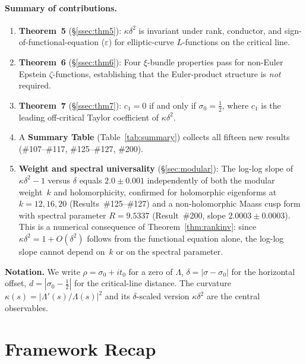 \documentclass[11pt, a4paper]{article}
\theoremstyle{plain}
\theoremstyle{definition}
\begin{document}
\paragraph{Summary of contributions.}
\begin{enumerate}
  \item \textbf{Theorem~5} (\S\ref{ssec:thm5}): $\kappa\delta^{2}$ is
        invariant under rank, conductor, and sign-of-functional-equation
        ($\varepsilon$) for elliptic-curve $L$-functions on the critical line.
  \item \textbf{Theorem~6} (\S\ref{ssec:thm6}): Four $\xi$-bundle
        properties pass for non-Euler Epstein $\zeta$-functions,
        establishing that the Euler-product structure is \emph{not}
        required.
  \item \textbf{Theorem~7} (\S\ref{ssec:thm7}): $c_{1}=0$ if and only
        if $\sigma_{0}=\tfrac{1}{2}$, where $c_{1}$ is the leading
        off-critical Taylor coefficient of $\kappa\delta^{2}$.
  \item A \textbf{Summary Table} (Table~\ref{tab:summary}) collects all
        fifteen new results (\#107--\#117, \#125--\#127, \#200).
  \item \textbf{Weight and spectral universality} (\S\ref{sec:modular}):
        The log-log slope of $\kappa\delta^{2}-1$ versus $\delta$ equals
        $2.0\pm0.001$ independently of both the modular weight~$k$ and
        holomorphicity, confirmed for holomorphic eigenforms at $k=12,16,20$
        (Results~\#125--\#127) and a non-holomorphic Maass cusp form with
        spectral parameter $R=9.5337$ (Result~\#200, slope
        $2.0003\pm 0.0003$).  This is a numerical consequence of
        Theorem~\ref{thm:rankinv}: since $\kappa\delta^{2}=1+O(\delta^{2})$
        follows from the functional equation alone, the log-log slope
        cannot depend on~$k$ or on the spectral parameter.
\end{enumerate}

\noindent\textbf{Notation.} We write $\rho = \sigma_{0}+it_{0}$ for a
zero of $\Lambda$, $\delta=|\sigma-\sigma_{0}|$ for the horizontal
offset, $d=|\sigma_{0}-\tfrac{1}{2}|$ for the critical-line distance.
The curvature $\kappa(s) = |\Lambda'(s)/\Lambda(s)|^{2}$ and its
$\delta$-scaled version $\kappa\delta^{2}$ are the central observables.


\section{Framework Recap}
\label{sec:recap}
\end{document}
